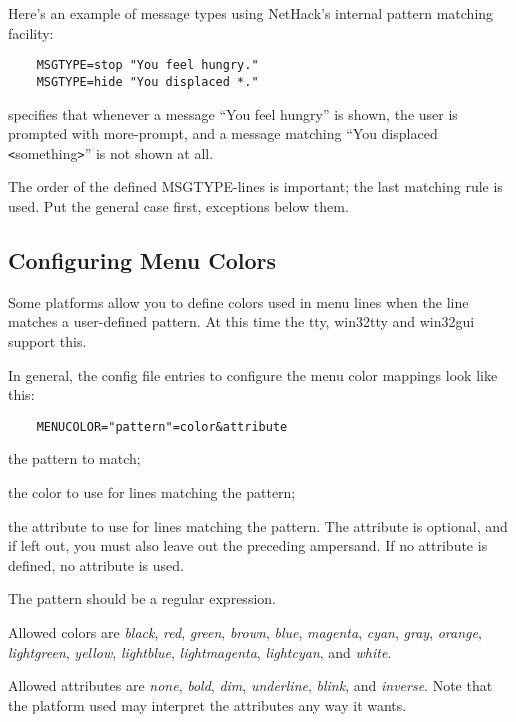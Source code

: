 Here's an example of message types using NetHack's internal
pattern matching facility:

\begin{verbatim}
    MSGTYPE=stop "You feel hungry."
    MSGTYPE=hide "You displaced *."
\end{verbatim}

specifies that whenever a message ``You feel hungry'' is shown,
the user is prompted with more-prompt, and a message matching
``You displaced  \verb+<+something\verb+>+'' is not shown at all.

The order of the defined MSGTYPE-lines is important; the last matching
rule is used. Put the general case first, exceptions below them.


\subsection*{Configuring Menu Colors}

Some platforms allow you to define colors used in menu lines when the
line matches a user-defined pattern. At this time the tty, win32tty and
win32gui support this.

In general, the config file entries to configure the menu color mappings
look like this:
\begin{verbatim}
    MENUCOLOR="pattern"=color&attribute
\end{verbatim}

\blist{}
\item[\ib{pattern}]
the pattern to match;
\item[\ib{color}]
the color to use for lines matching the pattern;
\item[\ib{attribute}]
the attribute to use for lines matching the pattern. The attribute is
optional, and if left out, you must also leave out the preceding ampersand.
If no attribute is defined, no attribute is used.
\elist

The pattern should be a regular expression.

Allowed colors are {\it black}, {\it red}, {\it green}, {\it brown},
{\it blue}, {\it magenta}, {\it cyan}, {\it gray}, {\it orange},
{\it lightgreen}, {\it yellow}, {\it lightblue}, {\it lightmagenta},
{\it lightcyan}, and {\it white}.

Allowed attributes are {\it none}, {\it bold}, {\it dim}, {\it underline},
{\it blink}, and {\it inverse}.
Note that the platform used may interpret the attributes any way it
wants.

